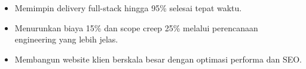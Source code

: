 \vspace{4pt}
\begin{itemize}
  \item Memimpin delivery full-stack hingga 95\% selesai tepat waktu.
  \item Menurunkan biaya 15\% dan scope creep 25\% melalui perencanaan engineering yang lebih jelas.
\end{itemize}
\vspace{4pt}
\begin{itemize}
  \item Membangun website klien berskala besar dengan optimasi performa dan SEO.
\end{itemize}